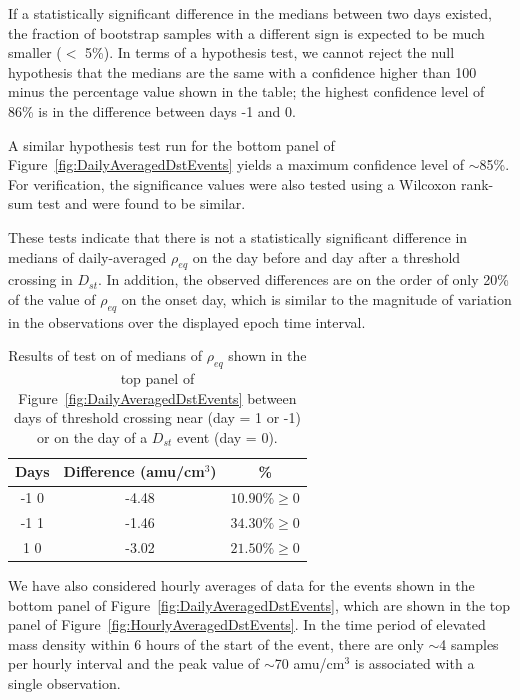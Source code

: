 \documentclass[draft,linenumbers]{agujournal}
\begin{document}
If a statistically significant difference in the medians between two days existed, the fraction of bootstrap samples with a different sign is expected to be much smaller ($<$ 5\%).  In terms of a hypothesis test, we cannot reject the null hypothesis that the medians are the same with a confidence higher than 100 minus the percentage value shown in the table; the highest confidence level of 86\% is in the difference between days -1 and 0.

A similar hypothesis test run for the bottom panel of Figure~\ref{fig:DailyAveragedDstEvents} yields a maximum confidence level of $\sim$85\%.  For verification, the significance values were also tested using a Wilcoxon rank-sum test and were found to be similar. 

These tests indicate that there is not a statistically significant difference in medians of daily-averaged $\rho_{eq}$ on the day before and day after a threshold crossing in $D_{st}$.  In addition, the observed differences are on the order of only 20\% of the value of $\rho_{eq}$ on the onset day, which is similar to the magnitude of variation in the observations over the displayed epoch time interval.  

\begin{table}
	\small
	\centering
	\begin{tabular}{|c|cc|}
		\hline 
		Days & Difference (amu/cm$^3$) & \%  \\ \hline
		-1 0 & -4.48 & $10.90\%\geq 0$  \\ 
		-1 1 & -1.46 & $34.30\%\geq 0$  \\ 
		1 0 & -3.02 & $21.50\%\geq 0$  \\ 
		\hline
	\end{tabular}
	\caption{Results of test on of medians of $\rho_{eq}$ shown in the top panel of Figure~\ref{fig:DailyAveragedDstEvents} between days of threshold crossing  near (day = 1 or -1) or on the day of a $D_{st}$ event (day = 0).}
	\label{BootstrapDifferenceTable}
\end{table}

We have also considered hourly averages of data for the events shown in the bottom panel of Figure~\ref{fig:DailyAveragedDstEvents}, which are shown in the top panel of Figure~\ref{fig:HourlyAveragedDstEvents}.  In the time period of elevated mass density within 6 hours of the start of the event, there are only $\sim$4 samples per hourly interval and the peak value of $\sim$70 amu/cm$^3$ is associated with a single observation. 
\end{document}
